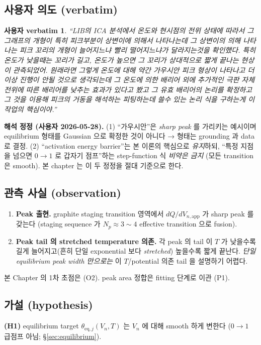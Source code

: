 \documentclass[11pt,a4paper]{article}
\newtheorem*{uservb}{사용자 verbatim}
\newcommand{\eq}{\mathrm{eq}}
\newcommand{\app}{\mathrm{app}}
\begin{document}
\subsection{사용자 의도 (verbatim)}\label{sec:verbatim}
\begin{uservb}
``LIB의 ICA 분석에서 온도와 현시점의 전위 상태에 따라서 그 그래프의 개형이 특히
피크부분이 상변이에 의해서 나타나는데 그 상변이의 의해 나타나는 피크 꼬리의 개형이
늘어지느냐 빨리 떨어지느냐가 달라지는것을 확인했다. 특히 온도가 낮을때는 꼬리가
길고, 온도가 높으면 그 꼬리가 상대적으로 짧게 끝나는 현상이 관측되었어. 원래라면
그렇게 온도에 대해 약간 가우시안 피크 형상이 나타나고 더이상 진행이 안될 것으로
생각되는데 그 온도에 의한 배리어 외에 추가적인 극판 자체 전위에 따른 배리어를
낮추는 효과가 있다고 봤고 그 유효 배리어의 논리를 확정하고 그 것을 이용해 피크의
거동을 해석하는 피팅하는데 쓸수 있는 논리 식을 구하는게 이 작업의 핵심이야.''
\end{uservb}

\textbf{해석 정정 (사용자 2026-05-28).} (1) ``가우시안''은 \emph{sharp peak} 를 가리키는
예시이며 equilibrium 형태를 Gaussian 으로 확정한 것이 아니다 → 형태는 grounding 과 data
로 결정. (2) ``activation energy barrier''는 본 이론의 핵심으로 \emph{유지}하되, ``특정
지점을 넘으면 $0\!\to\!1$ 로 갑자기 점프''하는 step-function 식 \emph{비약은 금지} (모든
transition 은 smooth). 본 chapter 는 이 두 정정을 절대 기준으로 한다.

\subsection{관측 사실 (observation)}\label{sec:observation}
\begin{enumerate}[label=\textbf{(O\arabic*)}]
\item \textbf{Peak 출현.} graphite staging transition 영역에서 $dQ/dV_{n,\app}$ 가 sharp
  peak 를 갖는다 (staging sequence 가 $N_p\approx3\sim4$ effective transition 으로 fusion).
\item \textbf{Peak tail 의 stretched temperature 의존.} 각 peak 의 tail 이 $T$ 가
  낮을수록 길게 늘어지고(흔히 단일 exponential 보다 \emph{stretched}) 높을수록 짧게
  끝난다. \emph{단일 equilibrium peak width 만으로는} 이 $T$/potential 의존 tail 을
  설명하기 어렵다.
\end{enumerate}
본 Chapter 의 1차 초점은 (O2). peak area 정합은 fitting 단계로 이관 (P1).

\subsection{가설 (hypothesis)}\label{sec:hypothesis}
\textbf{(H1)} equilibrium target $\theta_{\eq,j}(V_n,T)$ 는 $V_n$ 에 대해 smooth 하게
변한다 ($0\!\to\!1$ 급점프 아님; \S\ref{sec:equilibrium}).
\end{document}

